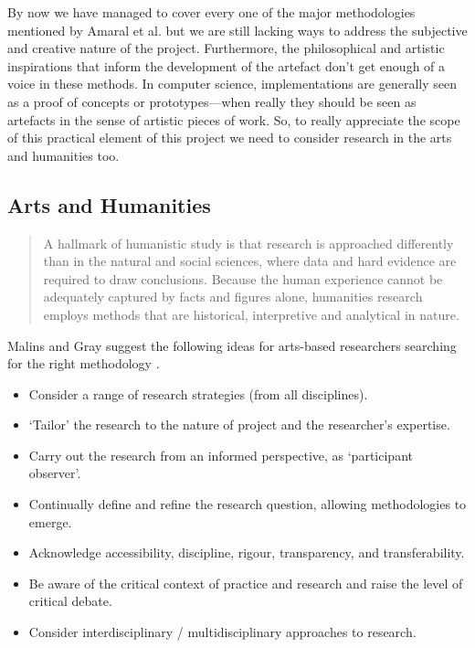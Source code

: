 By now we have managed to cover every one of the major methodologies mentioned by Amaral et al. \autocite*{Amaral2006} but we are still lacking ways to address the subjective and creative nature of the project. Furthermore, the philosophical and artistic inspirations that inform the development of the artefact don't get enough of a voice in these methods. In computer science, implementations are generally seen as a proof of concepts or prototypes---when really they should be seen as artefacts in the sense of artistic pieces of work. So, to really appreciate the scope of this practical element of this project we need to consider research in the arts and humanities too.


\subsection{Arts and Humanities}


\begin{quotation}
  A hallmark of humanistic study is that research is approached differently than in the natural and social sciences, where data and hard evidence are required to draw conclusions. Because the human experience cannot be adequately captured by facts and figures alone, humanities research employs methods that are historical, interpretive and analytical in nature. 
\end{quotation}

Malins and Gray suggest the following ideas for arts-based researchers searching for the right methodology \autocite*{Malins1995}.

\begin{itemize}
  \item Consider a range of research strategies (from all disciplines).
  \item `Tailor' the research to the nature of project and the researcher's expertise.
  \item Carry out the research from an informed perspective, as `participant observer'.
  \item Continually define and refine the research question, allowing methodologies to emerge.
  \item Acknowledge accessibility, discipline, rigour, transparency, and transferability.
  \item Be aware of the critical context of practice and research and raise the level of critical debate.
  \item Consider interdisciplinary / multidisciplinary approaches to research.
\end{itemize}

